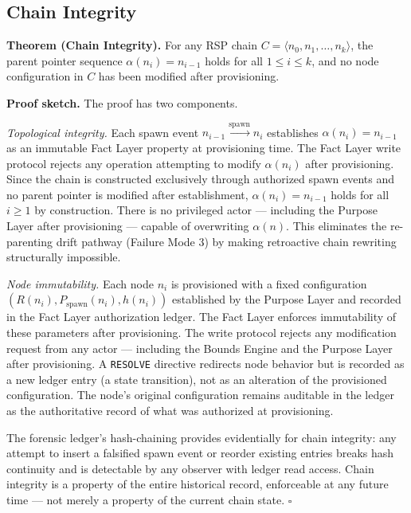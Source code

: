 \subsection{Chain Integrity}
\label{sec:rs-chain-integrity}

\medskip
\noindent\textbf{Theorem (Chain Integrity).} For any RSP chain $C = \langle n_0, n_1, \ldots, n_k \rangle$, the parent pointer sequence $\alpha(n_i) = n_{i-1}$ holds for all $1 \leq i \leq k$, and no node configuration in $C$ has been modified after provisioning.

\medskip
\noindent\textbf{Proof sketch.} The proof has two components.

\medskip
\textit{Topological integrity.} Each spawn event $n_{i-1} \xrightarrow{\mathrm{spawn}} n_i$ establishes $\alpha(n_i) = n_{i-1}$ as an immutable Fact Layer property at provisioning time. The Fact Layer write protocol rejects any operation attempting to modify $\alpha(n_i)$ after provisioning. Since the chain is constructed exclusively through authorized spawn events and no parent pointer is modified after establishment, $\alpha(n_i) = n_{i-1}$ holds for all $i \geq 1$ by construction. There is no privileged actor --- including the Purpose Layer after provisioning --- capable of overwriting $\alpha(n)$. This eliminates the re-parenting drift pathway (Failure Mode 3) by making retroactive chain rewriting structurally impossible.

\medskip
\textit{Node immutability.} Each node $n_i$ is provisioned with a fixed configuration $(R(n_i), P_{\mathrm{spawn}}(n_i), h(n_i))$ established by the Purpose Layer and recorded in the Fact Layer authorization ledger. The Fact Layer enforces immutability of these parameters after provisioning. The write protocol rejects any modification request from any actor --- including the Bounds Engine and the Purpose Layer after provisioning. A \texttt{RESOLVE} directive redirects node behavior but is recorded as a new ledger entry (a state transition), not as an alteration of the provisioned configuration. The node's original configuration remains auditable in the ledger as the authoritative record of what was authorized at provisioning.

The forensic ledger's hash-chaining provides evidentially for chain integrity: any attempt to insert a falsified spawn event or reorder existing entries breaks hash continuity and is detectable by any observer with ledger read access. Chain integrity is a property of the entire historical record, enforceable at any future time --- not merely a property of the current chain state. $\square$

